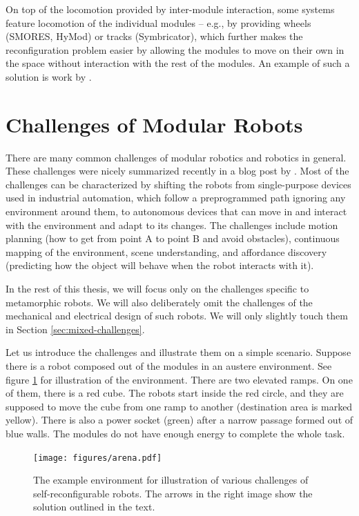 On top of the locomotion provided by inter-module interaction, some systems
feature locomotion of the individual modules -- e.g., by providing wheels
(SMORES, HyMod) or tracks (Symbricator), which further makes the reconfiguration
problem easier by allowing the modules to move on their own in the space without
interaction with the rest of the modules. An example of such a solution is
work by \textcite{DBLP:journals/ral/LiuWY19}.

\section{Challenges of Modular Robots}

There are many common challenges of modular robotics and robotics in general.
These challenges were nicely summarized recently in a blog post by
\textcite{locklin_2020}. Most of the challenges can be characterized by shifting
the robots from single-purpose devices used in industrial automation, which
follow a preprogrammed path ignoring any environment around them, to autonomous
devices that can move in and interact with the environment and adapt to its
changes. The challenges include motion planning (how to get from
point A to point B and avoid obstacles), continuous mapping of the environment,
scene understanding, and affordance discovery (predicting how the object will
behave when the robot interacts with it).

In the rest of this thesis, we will focus only on the challenges specific to
metamorphic robots. We will also deliberately omit the challenges of the
mechanical and electrical design of such robots. We will only slightly touch
them in Section \ref{sec:mixed-challenges}.

Let us introduce the challenges and illustrate them on a simple scenario.
Suppose there is a robot composed out of the modules in an austere environment.
See figure \ref{fig:arena} for illustration of the environment. There are two
elevated ramps. On one of them, there is a red cube. The robots start inside the
red circle, and they are supposed to move the cube from one ramp to another
(destination area is marked yellow). There is also a power socket (green) after
a narrow passage formed out of blue walls. The modules do not have enough energy
to complete the whole task.

\begin{figure}[!t]
    \centering
    \texttt{[image: figures/arena.pdf]}
    \caption{The example environment for illustration of various challenges of
    self-reconfigurable robots. The arrows in the right image show the
    solution outlined in the text.}
    \label{fig:arena}
\end{figure}

